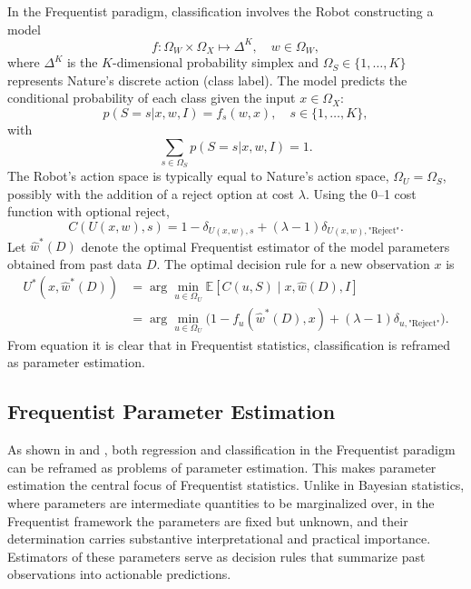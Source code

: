 In the Frequentist paradigm, classification involves the Robot constructing a model
\begin{equation}
	f: \Omega_W \times \Omega_X \mapsto \Delta^K, \quad w \in \Omega_W,
\end{equation}
where $\Delta^K$ is the $K$-dimensional probability simplex and $\Omega_S \in \{1,\dots,K\}$ represents Nature's discrete action (class label). The model predicts the conditional probability of each class given the input $x \in \Omega_X$:
\begin{equation}
	p(S = s | x, w, I) = f_s(w, x), \quad s \in \{1,\dots,K\},
\end{equation}
with
\begin{equation}
	\sum_{s\in \Omega_S} p(S = s | x, w, I) = 1.
\end{equation}
The Robot's action space is typically equal to Nature's action space, $\Omega_U = \Omega_S$, possibly with the addition of a reject option at cost $\lambda$. Using the 0--1 cost function with optional reject,
\begin{equation}
	C(U(x,w), s) = 1 - \delta_{U(x,w),s} + (\lambda-1)\delta_{U(x,w), \text{"Reject"}}.
\end{equation}
Let $\hat{w}^*(D)$ denote the optimal Frequentist estimator of the model parameters obtained from past data $D$. The optimal decision rule for a new observation $x$ is
\begin{equation}
	\begin{split}
		U^*(x, \hat{w}^*(D)) &= \arg\min_{u \in \Omega_U} \mathbb{E}[C(u, S) \mid x, \hat{w}(D), I] \\
		&= \arg\min_{u \in \Omega_U} \Big(1 - f_{u}(\hat{w}^*(D), x) + (\lambda-1)\delta_{u, \text{"Reject"}}\Big).
	\end{split}
	\label{freq:decision_classification}
\end{equation}
From equation  it is clear that in Frequentist statistics, classification is reframed as parameter estimation.


\subsection{Frequentist Parameter Estimation}
\label{chp:frequentist_parameter_estimation}
As shown in  and , both regression and classification in the Frequentist paradigm can be reframed as problems of parameter estimation. This makes parameter estimation the central focus of Frequentist statistics. Unlike in Bayesian statistics, where parameters are intermediate quantities to be marginalized over, in the Frequentist framework the parameters are fixed but unknown, and their determination carries substantive interpretational and practical importance. Estimators of these parameters serve as decision rules that summarize past observations into actionable predictions.

